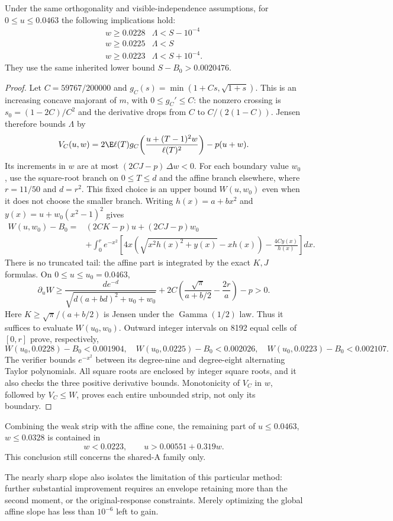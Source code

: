 \begin{theorem}\label{thm:shared-a-strip-audit}
Under the same orthogonality and visible-independence assumptions, for
$0\le u\le0.0463$ the following implications hold:
\[
\begin{array}{c|c}
 w\ge0.0228&\Lambda<S-10^{-4}\\
 w\ge0.0225&\Lambda<S\\
 w\ge0.0223&\Lambda<S+10^{-4}.
\end{array}
\]
They use the same inherited lower bound $S-B_0>0.0020476$.
\end{theorem}
\begin{proof}
Let $C=59767/200000$ and
$g_C(s)=\min(1+Cs,\sqrt{1+s})$. This is an increasing concave majorant
of $m$, with $0\le g_C'\le C$: the nonzero crossing is
$s_0=(1-2C)/C^2$ and the derivative drops from $C$ to
$C/(2(1-C))$. Jensen therefore bounds $\Lambda$ by
\[
 V_C(u,w)=2\E\ell(T)g_C\!\left(\frac{u+(T-1)^2w}{\ell(T)^2}\right)-p(u+w).
\]
Its increments in $w$ are at most $(2CJ-p)\,\Delta w<0$.
For each boundary value $w_0$, use the square-root branch on
$0\le T\le d$ and the affine branch elsewhere, where
$r=11/50$ and $d=r^2$. This fixed choice is an upper bound $W(u,w_0)$
even when it does not choose the smaller branch. Writing
$h(x)=a+bx^2$ and $y(x)=u+w_0(x^2-1)^2$ gives
\begin{align*}
 W(u,w_0)-B_0={}&(2CK-p)u+(2CJ-p)w_0\\
 &+\int_0^r e^{-x^2}\left[
 4x\left(\sqrt{x^2h(x)^2+y(x)}-xh(x)\right)
 -\frac{4Cy(x)}{h(x)}\right]dx.
\end{align*}
There is no truncated tail: the affine part is integrated by the exact
$K,J$ formulas. On $0\le u\le u_0=0.0463$,
\[
 \partial_uW\ge
 \frac{de^{-d}}{\sqrt{d(a+bd)^2+u_0+w_0}}
 +2C\left(\frac{\sqrt\pi}{a+b/2}-\frac{2r}{a}\right)-p>0.
\]
Here $K\ge\sqrt\pi/(a+b/2)$ is Jensen under the
$\operatorname{Gamma}(1/2)$ law. Thus it suffices to evaluate
$W(u_0,w_0)$. Outward integer intervals on 8192 equal cells of $[0,r]$
prove, respectively,
\[
 W(u_0,0.0228)-B_0<0.001904,\quad
 W(u_0,0.0225)-B_0<0.002026,\quad
 W(u_0,0.0223)-B_0<0.002107.
\]
The verifier bounds $e^{-x^2}$ between its degree-nine and degree-eight
alternating Taylor polynomials. All square roots are enclosed by integer
square roots, and it also checks the three positive derivative bounds.
Monotonicity of $V_C$ in $w$, followed by $V_C\le W$, proves each entire
unbounded strip, not only its boundary.
\end{proof}

Combining the weak strip with the affine cone, the remaining part of
$u\le0.0463$, $w\le0.0328$ is contained in
\[
 w<0.0223,\qquad u>0.00551+0.319w.
\]
This conclusion still concerns the shared-A family only.

The nearly sharp slope also isolates the limitation of this particular
method: further substantial improvement requires an envelope retaining
more than the second moment, or the original-response constraints. Merely
optimizing the global affine slope has less than $10^{-6}$ left to gain.

